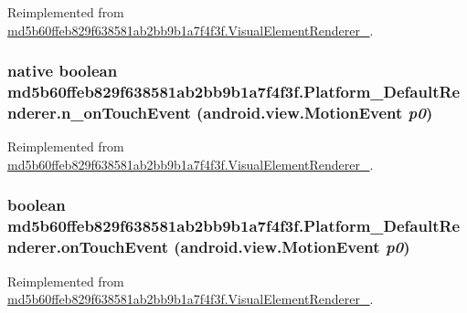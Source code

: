 Reimplemented from \hyperlink{classmd5b60ffeb829f638581ab2bb9b1a7f4f3f_1_1_visual_element_renderer__1_ecca707bf9b175721aeea8b3018d9c9a}{md5b60ffeb829f638581ab2bb9b1a7f4f3f.VisualElementRenderer\_}.\hypertarget{classmd5b60ffeb829f638581ab2bb9b1a7f4f3f_1_1_platform___default_renderer_b0074968bde1ff3ab9249da5dcda2751}{
\subsubsection[{n\_\-onTouchEvent}]{\setlength{\rightskip}{0pt plus 5cm}native boolean md5b60ffeb829f638581ab2bb9b1a7f4f3f.Platform\_\-DefaultRenderer.n\_\-onTouchEvent (android.view.MotionEvent {\em p0})}}
\label{classmd5b60ffeb829f638581ab2bb9b1a7f4f3f_1_1_platform___default_renderer_b0074968bde1ff3ab9249da5dcda2751}




Reimplemented from \hyperlink{classmd5b60ffeb829f638581ab2bb9b1a7f4f3f_1_1_visual_element_renderer__1_bf46ffd446313b87383a085a60d65dd4}{md5b60ffeb829f638581ab2bb9b1a7f4f3f.VisualElementRenderer\_}.\hypertarget{classmd5b60ffeb829f638581ab2bb9b1a7f4f3f_1_1_platform___default_renderer_07ccce17539adcbc1b97fbfc02107560}{
\subsubsection[{onTouchEvent}]{\setlength{\rightskip}{0pt plus 5cm}boolean md5b60ffeb829f638581ab2bb9b1a7f4f3f.Platform\_\-DefaultRenderer.onTouchEvent (android.view.MotionEvent {\em p0})}}
\label{classmd5b60ffeb829f638581ab2bb9b1a7f4f3f_1_1_platform___default_renderer_07ccce17539adcbc1b97fbfc02107560}




Reimplemented from \hyperlink{classmd5b60ffeb829f638581ab2bb9b1a7f4f3f_1_1_visual_element_renderer__1_3beb6d0ebf9e1eca68fed2eac13c88ac}{md5b60ffeb829f638581ab2bb9b1a7f4f3f.VisualElementRenderer\_}.

